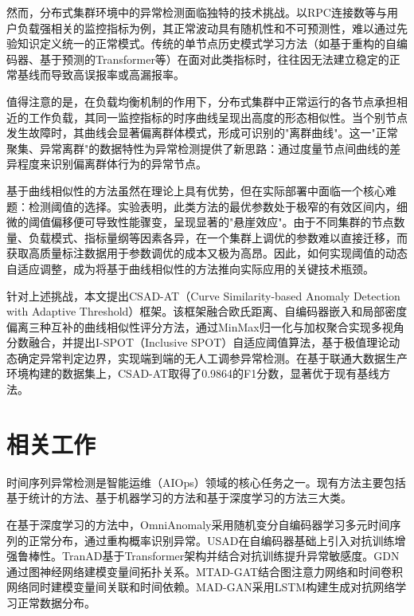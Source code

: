 \documentclass[10.5pt,a4paper,twocolumn]{ctexart}
\begin{document}
然而，分布式集群环境中的异常检测面临独特的技术挑战。以RPC连接数等与用户负载强相关的监控指标为例，其正常波动具有随机性和不可预测性，难以通过先验知识定义统一的正常模式。传统的单节点历史模式学习方法（如基于重构的自编码器、基于预测的Transformer等）在面对此类指标时，往往因无法建立稳定的正常基线而导致高误报率或高漏报率。

值得注意的是，在负载均衡机制的作用下，分布式集群中正常运行的各节点承担相近的工作负载，其同一监控指标的时序曲线呈现出高度的形态相似性。当个别节点发生故障时，其曲线会显著偏离群体模式，形成可识别的"离群曲线"。这一"正常聚集、异常离群"的数据特性为异常检测提供了新思路：通过度量节点间曲线的差异程度来识别偏离群体行为的异常节点。

基于曲线相似性的方法虽然在理论上具有优势，但在实际部署中面临一个核心难题：检测阈值的选择。实验表明，此类方法的最优参数处于极窄的有效区间内，细微的阈值偏移便可导致性能骤变，呈现显著的"悬崖效应"。由于不同集群的节点数量、负载模式、指标量纲等因素各异，在一个集群上调优的参数难以直接迁移，而获取高质量标注数据用于参数调优的成本又极为高昂。因此，如何实现阈值的动态自适应调整，成为将基于曲线相似性的方法推向实际应用的关键技术瓶颈。

针对上述挑战，本文提出CSAD-AT（Curve Similarity-based Anomaly Detection with Adaptive Threshold）框架。该框架融合欧氏距离、自编码器嵌入和局部密度偏离三种互补的曲线相似性评分方法，通过MinMax归一化与加权聚合实现多视角分数融合，并提出I-SPOT（Inclusive SPOT）自适应阈值算法，基于极值理论动态确定异常判定边界，实现端到端的无人工调参异常检测。在基于联通大数据生产环境构建的数据集上，CSAD-AT取得了0.9864的F1分数，显著优于现有基线方法。


\section{相关工作}

时间序列异常检测是智能运维（AIOps）领域的核心任务之一。现有方法主要包括基于统计的方法、基于机器学习的方法和基于深度学习的方法三大类。

在基于深度学习的方法中，OmniAnomaly\cite{su2019omni}采用随机变分自编码器学习多元时间序列的正常分布，通过重构概率识别异常。USAD\cite{audibert2020usad}在自编码器基础上引入对抗训练增强鲁棒性。TranAD\cite{tuli2022tranad}基于Transformer架构并结合对抗训练提升异常敏感度。GDN\cite{deng2021graph}通过图神经网络建模变量间拓扑关系。MTAD-GAT\cite{zhao2020mtadgat}结合图注意力网络和时间卷积网络同时建模变量间关联和时间依赖。MAD-GAN\cite{li2019madgan}采用LSTM构建生成对抗网络学习正常数据分布。
\end{document}

